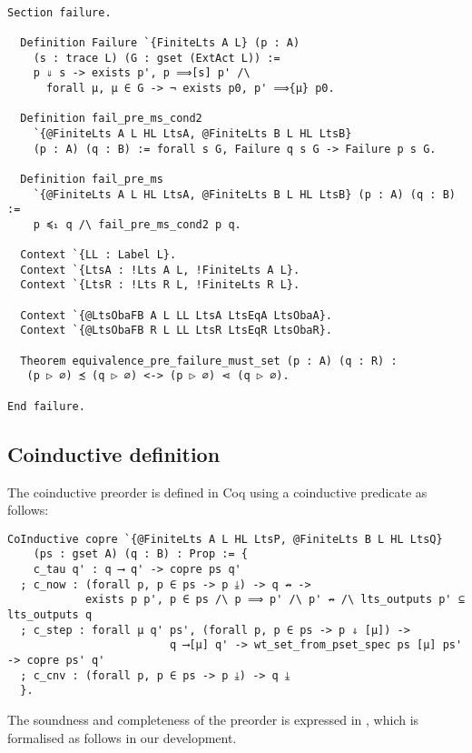 \begin{mdframed}
\begin{verbatim}

Section failure.

  Definition Failure `{FiniteLts A L} (p : A)
    (s : trace L) (G : gset (ExtAct L)) :=
    p ⇓ s -> exists p', p ⟹[s] p' /\
      forall μ, μ ∈ G -> ¬ exists p0, p' ⟹{μ} p0.

  Definition fail_pre_ms_cond2
    `{@FiniteLts A L HL LtsA, @FiniteLts B L HL LtsB}
    (p : A) (q : B) := forall s G, Failure q s G -> Failure p s G.

  Definition fail_pre_ms
    `{@FiniteLts A L HL LtsA, @FiniteLts B L HL LtsB} (p : A) (q : B) :=
    p ≼₁ q /\ fail_pre_ms_cond2 p q.

  Context `{LL : Label L}.
  Context `{LtsA : !Lts A L, !FiniteLts A L}.
  Context `{LtsR : !Lts R L, !FiniteLts R L}.

  Context `{@LtsObaFB A L LL LtsA LtsEqA LtsObaA}.
  Context `{@LtsObaFB R L LL LtsR LtsEqR LtsObaR}.

  Theorem equivalence_pre_failure_must_set (p : A) (q : R) :
   (p ▷ ∅) ≾ (q ▷ ∅) <-> (p ▷ ∅) ⋖ (q ▷ ∅).

End failure.
\end{verbatim}
\end{mdframed}

\subsection{Coinductive definition}

The coinductive preorder is defined in Coq using a coinductive predicate as
follows:



\begin{mdframed}
  \begin{verbatim}
CoInductive copre `{@FiniteLts A L HL LtsP, @FiniteLts B L HL LtsQ}
    (ps : gset A) (q : B) : Prop := {
    c_tau q' : q ⟶ q' -> copre ps q'
  ; c_now : (forall p, p ∈ ps -> p ⤓) -> q ↛ ->
            exists p p', p ∈ ps /\ p ⟹ p' /\ p' ↛ /\ lts_outputs p' ⊆ lts_outputs q
  ; c_step : forall μ q' ps', (forall p, p ∈ ps -> p ⇓ [μ]) ->
                         q ⟶[μ] q' -> wt_set_from_pset_spec ps [μ] ps' -> copre ps' q'
  ; c_cnv : (forall p, p ∈ ps -> p ⤓) -> q ⤓
  }.
  \end{verbatim}
\end{mdframed}

The soundness and completeness of the preorder is expressed in
, which is formalised as follows in our
development.


